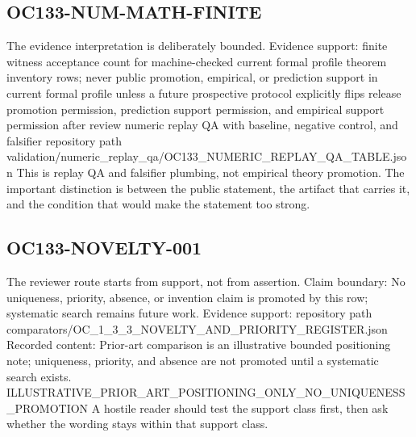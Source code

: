 \subsection{OC133-NUM-MATH-FINITE}
The evidence interpretation is deliberately bounded. Evidence support: finite witness acceptance count for machine-checked current formal profile theorem inventory rows; never public promotion, empirical, or prediction support in current formal profile unless a future prospective protocol explicitly flips release promotion permission, prediction support permission, and empirical support permission after review numeric replay QA with baseline, negative control, and falsifier repository path validation/numeric\_replay\_qa/OC133\_NUMERIC\_REPLAY\_QA\_TABLE.json This is replay QA and falsifier plumbing, not empirical theory promotion. The important distinction is between the public statement, the artifact that carries it, and the condition that would make the statement too strong.

\subsection{OC133-NOVELTY-001}
The reviewer route starts from support, not from assertion. Claim boundary: No uniqueness, priority, absence, or invention claim is promoted by this row; systematic search remains future work. Evidence support: repository path comparators/OC\_1\_3\_3\_NOVELTY\_AND\_PRIORITY\_REGISTER.json Recorded content: Prior-art comparison is an illustrative bounded positioning note; uniqueness, priority, and absence are not promoted until a systematic search exists. ILLUSTRATIVE\_PRIOR\_ART\_POSITIONING\_ONLY\_NO\_UNIQUENESS\_PROMOTION A hostile reader should test the support class first, then ask whether the wording stays within that support class.
